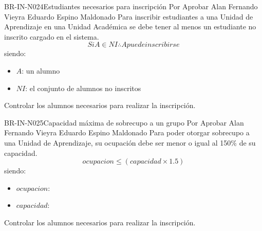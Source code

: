 \begin{BusinessRule}{BR-IN-N024}{Estudiantes necesarios para inscripción}
	{\bcCondition}    %
	{\btEnabler}     %
	{\blControlling}    %
	\BRItem[Estado] Por Aprobar
	 Alan Fernando Vieyra
	 Eduardo Espino Maldonado
	\BRItem[Descripción] Para inscribir estudiantes a una Unidad de Aprendizaje en una Unidad Académica se debe tener al menos un estudiante no inscrito cargado en el sistema.
	\BRItem[Sentencia] $$Si A \in NI \therefore A puede inscribirse$$
	siendo:
	\begin{itemize}
		\item $A$: un alumno
		\item $NI$: el conjunto de alumnos no inscritos
	\end{itemize}
	\BRItem[Motivación] Controlar los alumnos necesarios para realizar la inscripción.
\end{BusinessRule}

\begin{BusinessRule}{BR-IN-N025}{Capacidad máxima de sobrecupo a un grupo}
	{\bcCondition}    %
	{\btTimer}     %
	{\blControlling}    %
	\BRItem[Estado] Por Aprobar
	 Alan Fernando Vieyra
	 Eduardo Espino Maldonado
	\BRItem[Descripción] Para poder otorgar sobrecupo a una Unidad de Aprendizaje, su ocupación debe ser menor o igual al 150$\%$ de su capacidad.
	\BRItem[Sentencia] $$ocupacion \leq (capacidad \times 1.5)$$
	siendo:
	\begin{itemize}
		\item $ocupacion$:   
		\item $capacidad$: 
	\end{itemize}
	\BRItem[Motivación] Controlar los alumnos necesarios para realizar la inscripción.
\end{BusinessRule}

